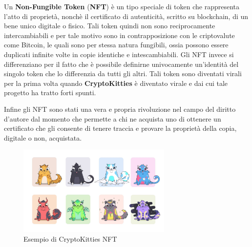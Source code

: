 Un \textbf{Non-Fungible Token} (\textbf{NFT}) è un tipo speciale di token che rappresenta l'atto di proprietà, nonchè il certificato di autenticità, scritto su blockchain, di un bene unico digitale o fisico. Tali token quindi non sono reciprocamente intercambiabili e per tale motivo sono in contrapposizione con le criptovalute come Bitcoin, le quali sono per stessa natura fungibili, ossia possono essere duplicati infinite volte in copie identiche e intescambiabili. Gli NFT invece si differenziano per il fatto che è possibile definirne univocamente un'identità del singolo token che lo differenzia da tutti gli altri. Tali token sono diventati virali per la prima volta quando \textbf{CryptoKitties} \cite{web:ck} è diventato virale e dai cui tale progetto ha tratto forti spunti.

Infine gli NFT sono stati una vera e propria rivoluzione nel campo del diritto d'autore dal momento che permette a chi ne acquista uno di ottenere un certificato che gli consente di tenere traccia e provare la proprietà della copia, digitale o non, acquistata.

\begin{figure}[h]
    \centering
    \includegraphics[width=0.68\textwidth]{img/NFT.png}
    \caption{Esempio di CryptoKitties NFT}
\end{figure}